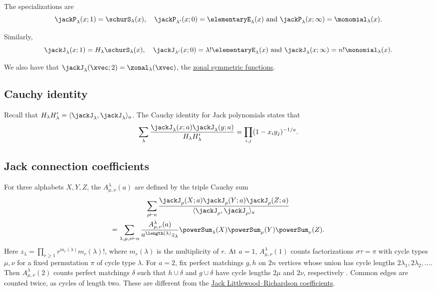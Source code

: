 The specializations are
\[
\jackP_\lambda(x;1) = \schurS_\lambda(x),\quad
\jackP_{\lambda'}(x;0) = \elementaryE_{\lambda}(x) \text{ and }
\jackP_{\lambda}(x;\infty) = \monomial_{\lambda}(x).
\]

Similarly,
\[
\jackJ_\lambda(x;1) = H_\lambda \schurS_\lambda(x), \quad
\jackJ_{\lambda'}(x;0) = \lambda! \elementaryE_{\lambda}(x) \text{ and }
\jackJ_{\lambda}(x;\infty) = n! \monomial_{\lambda}(x).
\]

We also have that $\jackJ_\lambda(\xvec;2) = \zonal_\lambda(\xvec)$, the
\hyperref[zonal]{zonal symmetric functions}.


\subsection[jackJCauchy]{Cauchy identity}

Recall that
$H_\lambda H'_\lambda = \langle \jackJ_\lambda, \jackJ_\lambda \rangle_a$.
The Cauchy identity for Jack polynomials states that
\[
\sum_{\lambda}
\frac{\jackJ_\lambda(x;a) \jackJ_\lambda(y;a)}{H_\lambda H'_\lambda}
=
\prod_{i,j} (1-x_i y_j)^{-1/a}.
\]


\subsection[jackConnectionCoefficients]{Jack connection coefficients}

For three alphabets $X,Y,Z$, the 
$A^\lambda_{\mu,\nu}(a)$ are defined by the triple Cauchy sum
\[
 \begin{gathered}
 \sum_{\rho\vdash n}
 \frac{\jackJ_\rho(X;a)\jackJ_\rho(Y;a)\jackJ_\rho(Z;a)}
      {\langle\jackJ_\rho,\jackJ_\rho\rangle_a}\\
 =
 \sum_{\lambda,\mu,\nu\vdash n}
 \frac{A^\lambda_{\mu,\nu}(a)}
      {a^{\length(\lambda)}z_\lambda}
 \powerSum_\lambda(X)\powerSum_\mu(Y)\powerSum_\nu(Z).
 \end{gathered}
\]
Here $z_\lambda=\prod_{r\geq1}r^{m_r(\lambda)}m_r(\lambda)!$,
where $m_r(\lambda)$ is the multiplicity of $r$.
At $a=1$, $A^\lambda_{\mu,\nu}(1)$ counts factorizations
$\sigma\tau=\pi$ with cycle types $\mu,\nu$ for a fixed permutation
$\pi$ of cycle type $\lambda$.
For $a=2$, fix perfect matchings $g,h$ on $2n$ vertices whose union
has cycle lengths $2\lambda_1,2\lambda_2,\dotsc$.
Then $A^\lambda_{\mu,\nu}(2)$ counts perfect matchings $\delta$
such that $h\cup\delta$ and $g\cup\delta$ have cycle lengths
$2\mu$ and $2\nu$, respectively \cite{KanunnikovVassilieva2016}.
Common edges are counted twice, as cycles of length two.
These are different from the
\hyperref[jackLittlewoodRichardsonConjecture]{Jack Littlewood--Richardson coefficients}.

